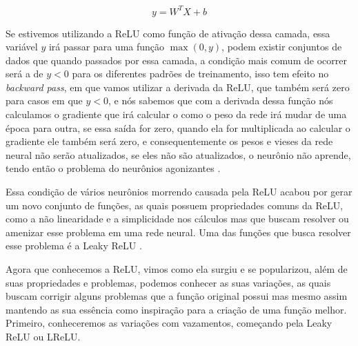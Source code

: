 \begin{equation}
    y = W^T X + b
    \label{eq: EquacaoNeuronio2}
\end{equation}

Se estivemos utilizando a ReLU como função de ativação dessa camada, essa variável $y$ irá passar para uma função $\max(0, y)$, podem existir conjuntos de dados que quando passados por essa camada, a condição mais comum de ocorrer será a de $y < 0$ para os diferentes padrões de treinamento, isso tem efeito no \textit{backward pass}, em que vamos utilizar a derivada da ReLU, que também será zero para casos em que $y < 0$, e nós sabemos que com a derivada dessa função nós calculamos o gradiente que irá calcular o como o peso da rede irá mudar de uma época para outra, se essa saída for zero, quando ela for multiplicada ao calcular o gradiente ele também será zero, e consequentemente os pesos e vieses da rede neural não serão atualizados, se eles não são atualizados, o neurônio não aprende, tendo então o problema do neurônios agonizantes \parencite{douglasDyingRelu}.

Essa condição de vários neurônios morrendo causada pela ReLU acabou por gerar um novo conjunto de funções, as quais possuem propriedades comuns da ReLU, como a não linearidade e a simplicidade nos cálculos mas que buscam resolver ou amenizar esse problema em uma rede neural. Uma das funções que busca resolver esse problema é a Leaky ReLU \parencite{douglasDyingRelu}.

Agora que conhecemos a ReLU, vimos como ela surgiu e se popularizou, além de suas propriedades e problemas, podemos conhecer as suas variações, as quais buscam corrigir alguns problemas que a função original possui mas mesmo assim mantendo as sua essência como inspiração para a criação de uma função melhor. Primeiro, conheceremos as variações com vazamentos, começando pela Leaky ReLU ou LReLU.